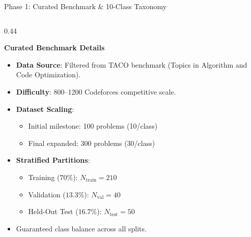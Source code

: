 \documentclass[aspectratio=169,10pt]{beamer}
\begin{document}
\begin{frame}{Phase 1: Curated Benchmark \& 10-Class Taxonomy}
  \begin{columns}[T]
    \begin{column}{0.44\textwidth}
      \begin{block}{\textbf{Curated Benchmark Details}}
        \begin{itemize}\itemsep=2pt\scriptsize
          \item \textbf{Data Source}: Filtered from TACO benchmark (Topics in Algorithm and Code Optimization).
          \item \textbf{Difficulty}: 800--1200 Codeforces competitive scale.
          \item \textbf{Dataset Scaling}:
            \begin{itemize}\scriptsize
              \item Initial milestone: 100 problems (10/class)
              \item Final expanded: 300 problems (30/class)
            \end{itemize}
          \item \textbf{Stratified Partitions}:
            \begin{itemize}\scriptsize
              \item Training ($70\%$): $N_{\text{train}} = 210$
              \item Validation ($13.3\%$): $N_{\text{val}} = 40$
              \item Held-Out Test ($16.7\%$): $N_{\text{test}} = 50$
            \end{itemize}
          \item Guaranteed class balance across all splits.
        \end{itemize}
      \end{block}
    \end{column}


\end{columns}
\end{frame}
\end{document}
